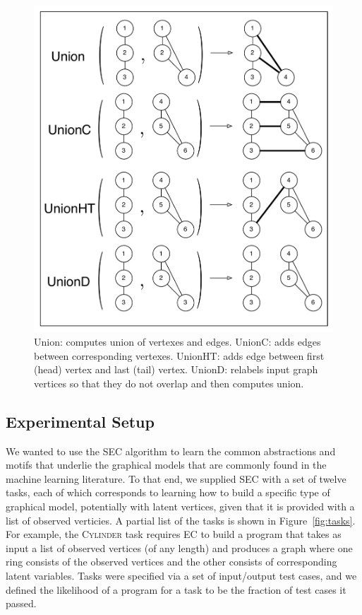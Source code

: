 \documentclass{article} %
\begin{document}
\begin{figure}[h]
\begin{minipage}[t]{.5\textwidth}
  \includegraphics[width=\linewidth]{./figures/GraphCombinators.pdf}
  \caption{Union: computes union of vertexes and edges. UnionC: adds edges between corresponding vertexes. UnionHT: adds edge between first (head) vertex and last (tail) vertex. UnionD: relabels input graph vertices so that they do not overlap and then computes union.}
  \label{fig:graphcomb}\par\vfill
\end{minipage}
\vspace{-0.5cm}
\end{figure}

\subsection{Experimental Setup}

We wanted to use the SEC algorithm to learn the common abstractions and motifs that underlie the graphical models that are commonly found in the machine learning literature. To that end, we supplied SEC with a set of twelve tasks, each of which corresponds to learning how to build a specific type of graphical model, potentially with latent vertices, given that it is provided with a list of observed verticies. A partial list of the tasks is shown in Figure~\ref{fig:tasks}. For example, the \textsc{Cylinder} task requires EC to build a program that takes as input a list of observed vertices (of any length) and produces a graph where one ring consists of the observed vertices and the other consists of corresponding latent variables. 
Tasks were specified via a set of input/output test cases, and we defined the likelihood of a program for a task to be the fraction of test cases it passed. 
\end{document}
